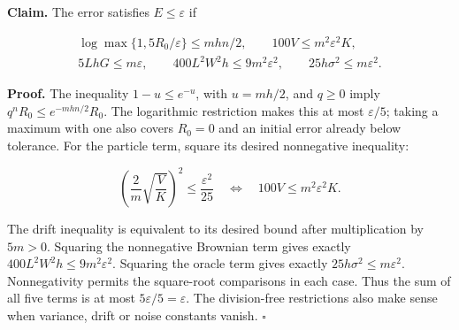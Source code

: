 \documentclass[11pt,a4paper]{report}
\begin{document}
\textbf{Claim.} The error satisfies \(E\le\varepsilon\) if

\[\begin{gathered}\log\max\{1,5R_0/\varepsilon\}\le mhn/2,\qquad 100V\le m^2\varepsilon^2K,\\5LhG\le m\varepsilon,\qquad400L^2W^2h\le9m^2\varepsilon^2,\qquad25h\sigma^2\le m\varepsilon^2.\end{gathered}\]

\textbf{Proof.} The inequality \(1-u\le e^{-u}\), with \(u=mh/2\), and \(q\ge0\) imply \(q^nR_0\le e^{-mhn/2}R_0\). The logarithmic restriction makes this at most \(\varepsilon/5\); taking a maximum with one also covers \(R_0=0\) and an initial error already below tolerance. For the particle term, square its desired nonnegative inequality:

\[\left(\frac2m\sqrt{\frac VK}\right)^2\le\frac{\varepsilon^2}{25}\quad\Longleftrightarrow\quad100V\le m^2\varepsilon^2K.\]

The drift inequality is equivalent to its desired bound after multiplication by \(5m>0\). Squaring the nonnegative Brownian term gives exactly \(400L^2W^2h\le9m^2\varepsilon^2\). Squaring the oracle term gives exactly \(25h\sigma^2\le m\varepsilon^2\). Nonnegativity permits the square-root comparisons in each case. Thus the sum of all five terms is at most \(5\varepsilon/5=\varepsilon\). The division-free restrictions also make sense when variance, drift or noise constants vanish. \(\square\)
\end{document}
